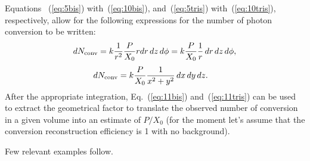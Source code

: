 Equations
~(\ref{eq:5bis})
with~(\ref{eq:10bis}), and~(\ref{eq:5tris}) with~(\ref{eq:10tris}),
respectively, allow for the following expressions for the number of photon
conversion to be written:
\begin{equation}
d N_{\rm conv} = k \frac{1}{r^2} 
\frac{P}{X_0} r dr\, dz\, d\phi = k
\frac{P}{X_0} \frac{1}{r}\, dr\, dz\, d\phi ,
\label{eq:11bis}
\end{equation}
\begin{equation}
\begin{split}
d N_{\rm conv} & = k \frac{P}{X_0} \frac{1}{x^2+y^2} \,dx\,dy\,dz .
\end{split}
\label{eq:11tris}
\end{equation}
After the appropriate integration,
Eq.~(\ref{eq:11bis}) and~(\ref{eq:11tris}) can be used to extract the
geometrical factor to translate the observed number of conversion in a given 
volume into an estimate of $P/X_0$ (for the moment let's assume that
the conversion reconstruction efficiency is 1 with no background).

Few relevant examples follow.

